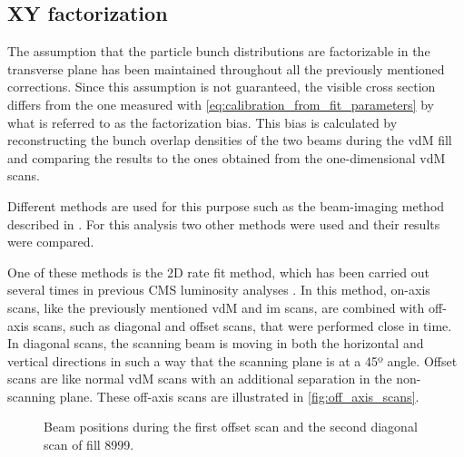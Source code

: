 \subsection{XY factorization}

The assumption that the particle bunch distributions are factorizable in the transverse plane has been maintained throughout all the previously mentioned corrections. Since this assumption is not guaranteed, the visible cross section differs from the one measured with \autoref{eq:calibration_from_fit_parameters} by what is referred to as the factorization bias. This bias is calculated by reconstructing the bunch overlap densities of the two beams during the vdM fill and comparing the results to the ones obtained from the one-dimensional vdM scans.

Different methods are used for this purpose such as the beam-imaging method described in \cite{Klute_2017, knolle2019factorizationbiasvander, Knolle:442689}. For this analysis two other methods were used and their results were compared.

One of these methods is the 2D rate fit method, which has been carried out several times in previous CMS luminosity analyses \cite{CMS-PAS-LUM-18-002, CMS-PAS-LUM-22-001}. In this method, on-axis scans, like the previously mentioned vdM and im scans, are combined with off-axis scans, such as diagonal and offset scans, that were performed close in time. In diagonal scans, the scanning beam is moving in both the horizontal and vertical directions in such a way that the scanning plane is at a 45º angle. Offset scans are like normal vdM scans with an additional separation in the non-scanning plane. These off-axis scans are illustrated in \autoref{fig:off_axis_scans}.

\begin{figure}[!htb]
	\centering
	\caption{Beam positions during the first offset scan and the second diagonal scan of fill 8999.}
	\label{fig:off_axis_scans}
\end{figure}

